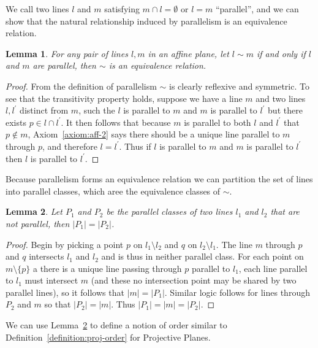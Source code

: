 \documentclass{article}
\newtheorem{lemma}{Lemma}
\begin{document}
We call two lines \(l\) and \(m\) satisfying \(m \cap l = \emptyset\) or \(l = m\) “parallel”, and we can show that the natural relationship induced by parallelism is an equivalence relation.

\begin{lemma}\label{lemma:parallel}
  For any pair of lines \(l, m\) in an affine plane, let \(l \sim m\) if and only if \(l\) and \(m\) are parallel, then \(\sim\) is an equivalence relation.
\end{lemma}
\begin{proof}
  From the definition of parallelism \(\sim\) is clearly reflexive and symmetric. To see that the transitivity property holds, suppose we have a line \(m\) and two lines \(l, l^{\prime}\) distinct from \(m\), such the \(l\) is parallel to \(m\) and \(m\) is parallel to \(l^{\prime}\) but there exists \(p \in l \cap l^{\prime}\).
  It then follows that because \(m\) is parallel to both \(l\) and \(l^{\prime}\) that \(p \notin m\), Axiom~\ref{axiom:aff-2} says there should be a unique line parallel to \(m\) through \(p\), and therefore \(l = l^{\prime}\). Thus if \(l\) is parallel to \(m\) and \(m\) is parallel to \(l^{\prime}\) then \(l\) is parallel to \(l^{\prime}\).
\end{proof}

Because parallelism forms an equivalence relation we can partition the set of lines into parallel classes, which aree the equivalence classes of \(\sim\).

\begin{lemma}\label{lemma:parallelclasses}
  Let \(P_{1}\) and \(P_{2}\) be the parallel classes of two lines \(l_{1}\) and \(l_{2}\) that are not parallel, then \(|P_{1}| = |P_{2}|\).
\end{lemma}
\begin{proof}
  Begin by picking a point \(p\) on \(l_{1} \setminus l_{2}\) and \(q\) on \(l_{2} \setminus l_{1}\). The line \(m\) through \(p\) and \(q\) intersects \(l_{1}\) and \(l_{2}\) and is thus in neither parallel class. For each point on \(m \setminus \{p\}\) a there is a unique line passing through \(p\) parallel to \(l_{1}\), each line parallel to \(l_{1}\) must intersect \(m\)
  (and these no intersection point may be shared by two parallel lines), so it follows that \(|m| = |P_{1}|\). Similar logic follows for lines through \(P_{2}\) and \(m\) so that \(|P_{2}| = |m|\). Thus \(|P_{1}| = |m| = |P_{2}|\).
\end{proof}

We can use Lemma~\ref{lemma:parallelclasses} to define a notion of order similar to Definition~\ref{definition:proj-order} for Projective Planes.
\end{document}
